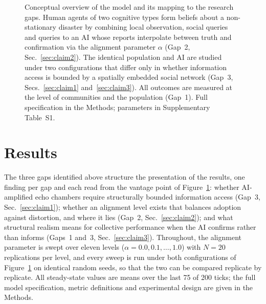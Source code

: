 \documentclass[pdflatex,sn-basic]{sn-jnl}
\begin{document}
\begin{figure}[h]
{}
\caption{Conceptual overview of the model and its mapping to the research gaps. Human agents of two cognitive types form beliefs about a non-stationary disaster by combining local observation, social queries and queries to an AI whose reports interpolate between truth and confirmation via the alignment parameter $\alpha$ (Gap~2, Sec.~\ref{sec:claim2}). The identical population and AI are studied under two configurations that differ only in whether information access is bounded by a spatially embedded social network (Gap~3, Secs.~\ref{sec:claim1} and~\ref{sec:claim3}). All outcomes are measured at the level of communities and the population (Gap~1). Full specification in the Methods; parameters in Supplementary Table~S1.}\label{fig:concept}
\end{figure}

\section{Results}\label{sec:results}

The three gaps identified above structure the presentation of the results, one finding per gap and each read from the vantage point of Figure~\ref{fig:concept}: whether AI-amplified echo chambers require structurally bounded information access (Gap~3, Sec.~\ref{sec:claim1}); whether an alignment level exists that balances adoption against distortion, and where it lies (Gap~2, Sec.~\ref{sec:claim2}); and what structural realism means for collective performance when the AI confirms rather than informs (Gaps~1 and~3, Sec.~\ref{sec:claim3}). Throughout, the alignment parameter is swept over eleven levels ($\alpha = 0.0, 0.1, \ldots, 1.0$) with $N = 20$ replications per level, and every sweep is run under both configurations of Figure~\ref{fig:concept} on identical random seeds, so that the two can be compared replicate by replicate. All steady-state values are means over the last 75 of 200 ticks; the full model specification, metric definitions and experimental design are given in the Methods.
\end{document}
